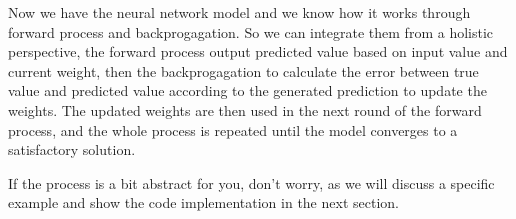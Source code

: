 \documentclass{article}
\begin{document}
Now we have the neural network model and we know how it works through forward process and backprogagation. So we can integrate them from a holistic perspective, the forward process output predicted value based on input value and current weight, then the backprogagation to calculate the error between true value and predicted value according to the generated prediction to update the weights. The updated weights are then used in the next round of the forward process, and the whole process is repeated until the model converges to a satisfactory solution.

If the process is a bit abstract for you, don't worry, as we will discuss a specific example and show the code implementation in the next section.

\\
\end{document}
